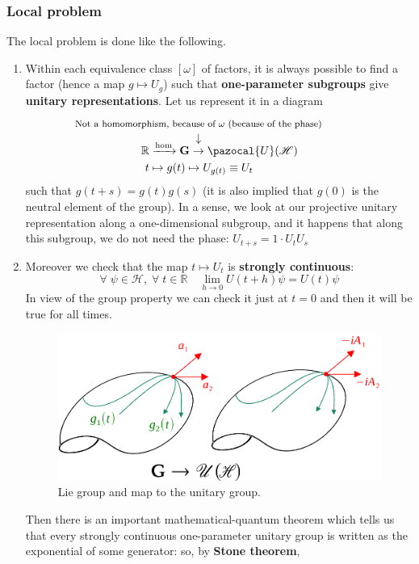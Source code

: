 \documentclass[../main.tex]{subfiles}
\begin{document}
\subsubsection{Local problem}
The local problem is done like the following.
\begin{enumerate}
    \item Within each equivalence class $[\omega]$ of factors, it is always possible to find a factor (hence a map $g\mapsto U_g$) such that \textbf{one-parameter subgroups} give \textbf{unitary representations}. Let us represent it in a diagram
    \[
    \begin{aligned}
    \mathbb{R}&\xrightarrow[]{\textrm{hom}}\mathbf{G}\overset{\mathclap{\tikz \node {$\downarrow$} node [above=1.25ex] {\footnotesize Not a homomorphism, because of $\omega$ (because of the phase)};}}{\to} \pazocal{U}(\mathcal{H})\\
    t&\mapsto g(t)\mapsto U_{g(t)}\equiv U_t
    \end{aligned}
    \]
    such that $g(t+s)=g(t)g(s)$ (it is also implied that $g(0)$ is the neutral element of the group). In a sense, we look at our projective unitary representation along a one-dimensional subgroup, and it happens that along this subgroup, we do not need the phase: $U_{t+s}=1\cdot U_tU_s$
    \item Moreover we check that the map $t\mapsto U_t$ is \textbf{strongly continuous}:
    \[
    \forall\;\psi\in\mathcal{H},\;\forall\;t\in\mathbb{R}\quad \lim_{h\to 0}U(t+h)\psi=U(t)\psi
    \]
    In view of the group property we can check it just at $t=0$ and then it will be true for all times.
    \begin{figure}[h!]
	\includegraphics[width=1\linewidth]{images/local_problem.pdf}
	\caption{Lie group and map to the unitary group.}
    \end{figure}
    Then there is an important mathematical-quantum theorem which tells us that every strongly continuous one-parameter unitary group is written as the exponential of some generator: so, by \textbf{Stone theorem},
\end{enumerate}
\end{document}
